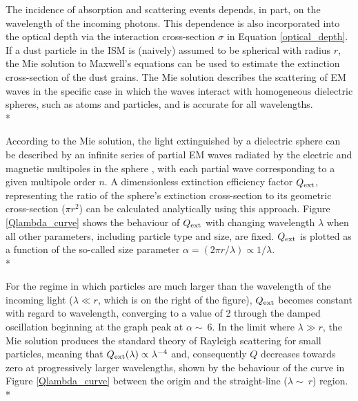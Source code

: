 \documentclass[12pt, a4paper]{report}
\begin{document}
The incidence of absorption and scattering events depends, in part, on the wavelength of the incoming photons. This dependence is also incorporated into the optical depth via the interaction cross-section $\sigma$ in Equation \ref{optical_depth}. If a dust particle in the ISM is (naively) assumed to be spherical with radius $r$, the Mie solution \citep{1908AnP...330..377M} to Maxwell's equations can be used to estimate the extinction cross-section of the dust grains. The Mie solution describes the scattering of EM waves in the specific case in which the waves interact with homogeneous dielectric spheres, such as atoms and particles, and is accurate for all wavelengths.\\*



According to the Mie solution, the light extinguished by a dielectric sphere can be described by an infinite series of partial EM waves radiated by the electric and magnetic multipoles in the sphere \citep{Grainger:04}, with each partial wave corresponding to a given multipole order $n$. A dimensionless extinction efficiency factor $Q_{\textnormal{ext}}$, representing the ratio of the sphere's extinction cross-section to its geometric cross-section ($\pi r^{2}$) can be calculated analytically using this approach. Figure \ref{Qlambda_curve} shows the behaviour of $Q_{\textnormal{ext}}$ with changing wavelength $\lambda$ when all other parameters, including particle type and size, are fixed. $Q_{\textnormal{ext}}$ is plotted as a function of the so-called size parameter $\alpha = (2\pi r/\lambda) \propto 1/\lambda$.\\*

For the regime in which particles are much larger than the wavelength of the incoming light ($\lambda \ll r$, which is on the right of the figure), $Q_{\textnormal{ext}}$ becomes constant with regard to wavelength, converging to a value of 2 through the damped oscillation beginning at the graph peak at $\alpha \sim\ 6$. In the limit where $\lambda \gg r$, the Mie solution produces the standard theory of Rayleigh scattering for small particles, meaning that $Q_{\textnormal{ext}}(\lambda) \propto \lambda^{-4}$ and, consequently $Q$ decreases towards zero at progressively larger wavelengths, shown by the behaviour of the curve in Figure \ref{Qlambda_curve} between the origin and the straight-line ($\lambda \sim\ r$) region.\\*
\end{document}

